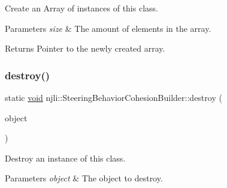 Create an Array of instances of this class.


\begin{DoxyParams}{Parameters}
{\em size} & The amount of elements in the array.\\
\hline
\end{DoxyParams}
\begin{DoxyReturn}{Returns}
Pointer to the newly created array. 
\end{DoxyReturn}
\mbox{\label{classnjli_1_1_steering_behavior_cohesion_builder_ae5df0f25d375e93748736de337e22a2d}} 
\subsubsection{\texorpdfstring{destroy()}{destroy()}}
{\footnotesize\ttfamily static \mbox{\hyperlink{_thread_8h_af1e856da2e658414cb2456cb6f7ebc66}{void}} njli\+::\+Steering\+Behavior\+Cohesion\+Builder\+::destroy (\begin{DoxyParamCaption}\item[{\mbox{\hyperlink{classnjli_1_1_steering_behavior_cohesion_builder}{Steering\+Behavior\+Cohesion\+Builder}} $\ast$}]{object }\end{DoxyParamCaption})\hspace{0.3cm}{\ttfamily [static]}}

Destroy an instance of this class.


\begin{DoxyParams}{Parameters}
{\em object} & The object to destroy. \\
\hline
\end{DoxyParams}
\mbox{\label{classnjli_1_1_steering_behavior_cohesion_builder_a38487036a881b6da1319297ba40c1844}} 
